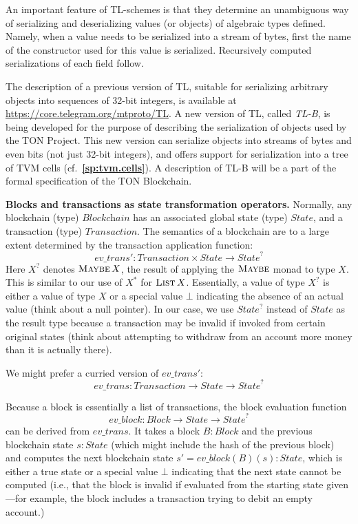 \documentclass[12pt,oneside]{article}
\def\makepoint#1{\medbreak\noindent{\bf #1.\ }}
\def\nxsubpoint{\refstepcounter{subsubsection}%
  \smallbreak\makepoint{\thesubsubsection}}
\def\refpoint#1{{\rm\textbf{\ref{#1}}}}
\let\ptref=\refpoint
\def\embt(#1.){\textbf{#1.}}
\let\tp=\textit
\let\vr=\textit
\def\opsc#1{\operatorname{\textsc{#1}}}
\def\Transaction{\tp{Transaction}}
\def\State{\tp{State}}
\def\Maybe{\opsc{Maybe}}
\def\List{\opsc{List}}
\def\Block{\tp{Block}}
\def\Blockchain{\tp{Blockchain}}
\def\evtrans{\vr{ev\_trans}}
\def\evblock{\vr{ev\_block}}
\begin{document}
An important feature of TL-schemes is that they determine an
unambiguous way of serializing and deserializing values (or objects)
of algebraic types defined. Namely, when a value needs to be
serialized into a stream of bytes, first the name of the constructor
used for this value is serialized. Recursively computed serializations
of each field follow.

The description of a previous version of TL, suitable for serializing
arbitrary objects into sequences of 32-bit integers, is available at
\url{https://core.telegram.org/mtproto/TL}. A new version of TL,
called {\em TL-B}, is being developed for the purpose of describing
the serialization of objects used by the TON Project. This new version
can serialize objects into streams of bytes and even bits (not just
32-bit integers), and offers support for serialization into a tree of
TVM cells (cf.~\ptref{sp:tvm.cells}). A description of TL-B will be a
part of the formal specification of the TON Blockchain.

\nxsubpoint\label{sp:blk.transf} \embt(Blocks and transactions as
state transformation operators.)  Normally, any blockchain (type)
$\Blockchain$ has an associated global state (type) $\State$, and a
transaction (type) $\Transaction$. The semantics of a blockchain are
to a large extent determined by the transaction application function:
\begin{equation}
  \evtrans':\Transaction\times\State\to\State^?
\end{equation}
Here $X^?$ denotes $\Maybe X$, the result of applying the $\Maybe$
monad to type $X$. This is similar to our use of $X^*$ for $\List
X$. Essentially, a value of type $X^?$ is either a value of type $X$
or a special value $\bot$ indicating the absence of an actual value
(think about a null pointer). In our case, we use $\State^?$ instead
of $\State$ as the result type because a transaction may be invalid if
invoked from certain original states (think about attempting to
withdraw from an account more money than it is actually there).

We might prefer a curried version of $\evtrans'$:
\begin{equation}
  \evtrans:\Transaction\to\State\to\State^?
\end{equation}

Because a block is essentially a list of transactions, the block
evaluation function
\begin{equation}
  \evblock:\Block\to\State\to\State^?
\end{equation}
can be derived from $\evtrans$. It takes a block $B:\Block$ and the
previous blockchain state $s:\State$ (which might include the hash of
the previous block) and computes the next blockchain state
$s'=\evblock(B)(s):\State$, which is either a true state or a special
value $\bot$ indicating that the next state cannot be computed (i.e.,
that the block is invalid if evaluated from the starting state
given---for example, the block includes a transaction trying to debit
an empty account.)
\end{document}
